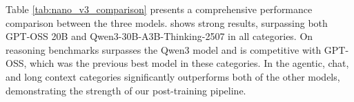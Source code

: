 Table \ref{tab:nano_v3_comparison} presents a comprehensive performance comparison between the three models. \ourmodel shows strong results, surpassing both GPT-OSS 20B and Qwen3-30B-A3B-Thinking-2507 in all categories. On reasoning benchmarks \ourmodel surpasses the Qwen3 model and is competitive with GPT-OSS, which was the previous best model in these categories. In the agentic, chat, and long context categories \ourmodel significantly outperforms both of the other models, demonstrating the strength of our post-training pipeline.

